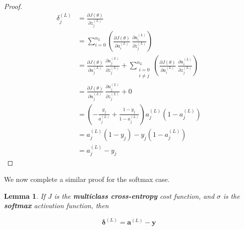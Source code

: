 \documentclass{article}[11pt]
\newtheorem{lemma}{Lemma}
\begin{document}
\begin{proof}
            $$ \begin{aligned}
            \delta^{(L)}_j &= \frac{\partial J(\theta)}{\partial z^{(L)}_j} \\
            &= \sum_{i = 0}^{n_L} \left( \frac{\partial J(\theta)}{\partial a^{(L)}_i} \ \frac{\partial a^{(L)}_i}{\partial z^{(L)}_j} \right) \\
            &= \frac{\partial J(\theta)}{\partial a^{(L)}_j} \ \frac{\partial a^{(L)}_j}{\partial z^{(L)}_j} + \sum_{\substack{i = 0 \\ i \neq j}}^{n_L} \left( \frac{\partial J(\theta)}{\partial a^{(L)}_i} \ \frac{\partial a^{(L)}_i}{\partial z^{(L)}_j} \right) \\
            &= \frac{\partial J(\theta)}{\partial a^{(L)}_j} \ \frac{\partial a^{(L)}_j}{\partial z^{(L)}_j} + 0 \\
            &= \left( - \frac{y_j}{a^{(L)}_j} + \frac{1 - y_j}{1 - a^{(L)}_j} \right) a^{(L)}_j \left( 1 - a^{(L)}_j \right) \\
            &= a^{(L)}_j (1 - y_j) - y_j (1 - a^{(L)}_j) \\
            &= a^{(L)}_j - y_j
            \end{aligned} $$
            
        \end{proof}
        
        
        We now complete a similar proof for the softmax case.
        
        
        \begin{lemma}
            
            If $J$ is the \textbf{multiclass cross-entropy} cost function, and $\sigma$ is the \textbf{softmax} activation function, then
            
            $$
            \boldsymbol{\delta}^{(L)} = \mathbf{a}^{(L)} - \mathbf{y}
            $$
            
        \end{lemma}
        
\end{document}
